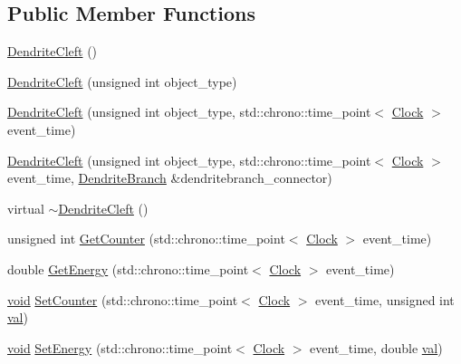 \subsection*{Public Member Functions}
\begin{DoxyCompactItemize}
\item 
\mbox{\hyperlink{class_dendrite_cleft_a244a2e6377fafdf79df757d39a2684e5}{Dendrite\+Cleft}} ()
\item 
\mbox{\hyperlink{class_dendrite_cleft_a335660dfc63f55980b2dcf8849568086}{Dendrite\+Cleft}} (unsigned int object\+\_\+type)
\item 
\mbox{\hyperlink{class_dendrite_cleft_ad4070ce743d8302bc120ea948890ea37}{Dendrite\+Cleft}} (unsigned int object\+\_\+type, std\+::chrono\+::time\+\_\+point$<$ \mbox{\hyperlink{universe_8h_a0ef8d951d1ca5ab3cfaf7ab4c7a6fd80}{Clock}} $>$ event\+\_\+time)
\item 
\mbox{\hyperlink{class_dendrite_cleft_abcb81284cd9bd7ee2863eecfb6b59f62}{Dendrite\+Cleft}} (unsigned int object\+\_\+type, std\+::chrono\+::time\+\_\+point$<$ \mbox{\hyperlink{universe_8h_a0ef8d951d1ca5ab3cfaf7ab4c7a6fd80}{Clock}} $>$ event\+\_\+time, \mbox{\hyperlink{class_dendrite_branch}{Dendrite\+Branch}} \&dendritebranch\+\_\+connector)
\item 
virtual \mbox{\hyperlink{class_dendrite_cleft_ad99958c45fa63f2f68b65d7e5ba45b32}{$\sim$\+Dendrite\+Cleft}} ()
\item 
unsigned int \mbox{\hyperlink{class_dendrite_cleft_ac567530d9f083e1ee65d5c6484cc9fa7}{Get\+Counter}} (std\+::chrono\+::time\+\_\+point$<$ \mbox{\hyperlink{universe_8h_a0ef8d951d1ca5ab3cfaf7ab4c7a6fd80}{Clock}} $>$ event\+\_\+time)
\item 
double \mbox{\hyperlink{class_dendrite_cleft_ad673df32db3982b3df745a55bf527834}{Get\+Energy}} (std\+::chrono\+::time\+\_\+point$<$ \mbox{\hyperlink{universe_8h_a0ef8d951d1ca5ab3cfaf7ab4c7a6fd80}{Clock}} $>$ event\+\_\+time)
\item 
\mbox{\hyperlink{glad_8h_a950fc91edb4504f62f1c577bf4727c29}{void}} \mbox{\hyperlink{class_dendrite_cleft_a428b8e5117f381a382e0071b936d42a1}{Set\+Counter}} (std\+::chrono\+::time\+\_\+point$<$ \mbox{\hyperlink{universe_8h_a0ef8d951d1ca5ab3cfaf7ab4c7a6fd80}{Clock}} $>$ event\+\_\+time, unsigned int \mbox{\hyperlink{glad_8h_a26942fd2ed566ef553eae82d2c109c8f}{val}})
\item 
\mbox{\hyperlink{glad_8h_a950fc91edb4504f62f1c577bf4727c29}{void}} \mbox{\hyperlink{class_dendrite_cleft_a7e09ccb70936deabde9c12457cec949c}{Set\+Energy}} (std\+::chrono\+::time\+\_\+point$<$ \mbox{\hyperlink{universe_8h_a0ef8d951d1ca5ab3cfaf7ab4c7a6fd80}{Clock}} $>$ event\+\_\+time, double \mbox{\hyperlink{glad_8h_a26942fd2ed566ef553eae82d2c109c8f}{val}})

\end{DoxyCompactItemize}
